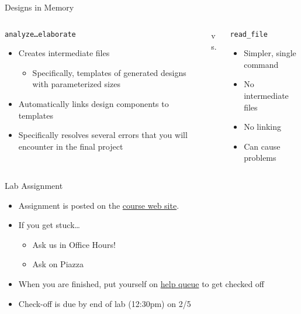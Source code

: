 \documentclass[dvipsnames]{beamer}
\begin{document}
\begin{frame}{Designs in Memory}
	\begin{columns}
		\begin{column}[T]{0.45\textwidth}
			\begin{block}{\texttt{analyze\dots elaborate}}
				\begin{itemize}
					\item Creates intermediate files 
						\begin{itemize}
							\item Specifically, templates of generated designs with
								parameterized sizes
						\end{itemize}
					\item Automatically links design components to templates
					\item Specifically resolves several errors that you will
						encounter in the final project
			\end{itemize}
			\end{block}
		\end{column}
		\begin{column}[T]{0.1\textwidth}
			\vspace*{0.3\textheight}
			\Large{vs.}
			\normalsize
		\end{column}
		\begin{column}[T]{0.45\textwidth}
			\begin{block}{\texttt{read\_file}}
				\begin{itemize}
					\item Simpler, single command
					\item No intermediate files
					\item No linking
					\item Can cause problems
				\end{itemize}
			\end{block}
		\end{column}
	\end{columns}
\end{frame}

\begin{frame}{Lab Assignment}
	\begin{itemize}
		\item Assignment is posted on the  
			\href{https://www.eecs.umich.edu/courses/eecs470/?page=schedule.php}{
			course web site}.
		\item If you get stuck\dots
			\begin{itemize}
				\item Ask us in Office Hours!
				\item Ask on Piazza
			\end{itemize}
		\item When you are finished, put yourself on \href{https://oh.eecs.umich.edu/courses/eecs470}{help queue} to get checked off
		\item Check-off is due by end of lab (12:30pm) on 2/5
	\end{itemize}
\end{frame}
\end{document}

